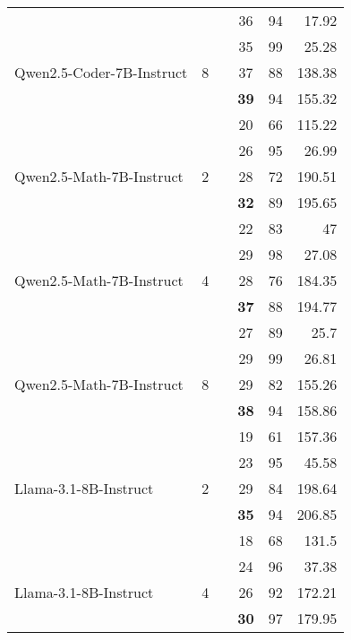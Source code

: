 \begin{table*}[t]
\begin{tabular}{llcccr}
\midrule

    & & \stdUnconstrained{} & 36 & 94 & 17.92 \\
 & & \stdConstrained{} & 35 & 99 & 25.28  \\
 Qwen2.5-Coder-7B-Instruct & 8 & \cotUnconstrained{} & 37 & 88 & 138.38 \\
 & & \textbf{\Tool{}} & \textbf{39} & 94 & 155.32\\

\midrule

     & & \stdUnconstrained{} & 20 & 66 & 115.22 \\
&  & \stdConstrained{} & 26 & 95 & 26.99 \\
 Qwen2.5-Math-7B-Instruct & 2 & \cotUnconstrained{} & 28 & 72 & 190.51 \\
 & & \textbf{\Tool{}} & \textbf{32} & 89 & 195.65 \\

 \midrule

    &  & \stdUnconstrained{} & 22 & 83 & 47 \\
 & & \stdConstrained{} & 29 & 98 & 27.08 \\
 Qwen2.5-Math-7B-Instruct & 4 & \cotUnconstrained{} & 28 & 76 & 184.35 \\
 & & \textbf{\Tool{}} & \textbf{37} & 88 & 194.77  \\

 \midrule

     & & \stdUnconstrained{} & 27 & 89 & 25.7 \\
 & & \stdConstrained{} & 29 & 99 & 26.81 \\
 Qwen2.5-Math-7B-Instruct & 8 &  \cotUnconstrained{} & 29 & 82 & 155.26\\
 & & \textbf{\Tool{}} & \textbf{38} & 94 & 158.86 \\

 \midrule

     & & \stdUnconstrained{} & 19 & 61 & 157.36 \\
 & & \stdConstrained{} & 23 & 95 & 45.58  \\
 Llama-3.1-8B-Instruct & 2 & \cotUnconstrained{} & 29 & 84 & 198.64 \\
 & & \textbf{\Tool{}} & \textbf{35} & 94 & 206.85 \\

 \midrule
     & & \stdUnconstrained{} & 18 & 68 & 131.5 \\
 & & \stdConstrained{} & 24 & 96 & 37.38  \\
 Llama-3.1-8B-Instruct & 4 & \cotUnconstrained{} & 26 & 92 & 172.21 \\
 & & \textbf{\Tool{}} & \textbf{30} & 97 & 179.95 \\


\end{tabular}
\end{table*}
